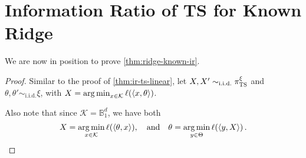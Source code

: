 \documentclass[letter, 12pt]{report}
\newcommand{\argmin}{\operatornamewithlimits{arg\,min}}
\newcommand{\ball}{\mathbb{B}}
\newcommand{\cK}{\mathcal K}
\newcommand{\1}{\mathbf{1}}
\newcommand{\ts}{\textsc{TS}\xspace}
\theoremstyle{plain}
\theoremstyle{definition}
\theoremstyle{remark}
\begin{document}
\section{Information Ratio of \ts for Known Ridge}
We are now in position to prove \cref{thm:ridge-known-ir}.
\KnownRidgeLemma
\begin{proof}
    Similar to the proof of \cref{thm:ir-ts-linear},
    let $X,X' \sim_{\text{i.i.d.}} \pi_\ts^\xi$
    and $\theta, \theta' \sim_{\text{i.i.d.}} \xi$,
    with $X = \argmin_{x \in \cK} \ell(\langle x, \theta\rangle)$.

    Also note that since $\cK = \ball_1^d$, we have both
    \begin{align}
        X = \argmin_{x \in \cK} \ell(\langle \theta, x \rangle),\quad \text{and} \quad
        \theta = \argmin_{y \in \Theta} \ell(\langle y, X \rangle)\,.
        \label{eq:double-greedy}
    \end{align}


\end{proof}
\end{document}
